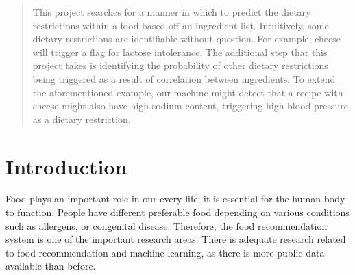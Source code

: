 \documentclass[twocolumn]{article}
\begin{document}
\begin{abstract}
This project searches for a manner in which to predict the dietary restrictions within a food based off an ingredient list. Intuitively, some dietary restrictions are identifiable without question. For example, cheese will trigger a flag for lactose intolerance. The additional step that this project takes is identifying the probability of other dietary restrictions being triggered as a result of correlation between ingredients. To extend the aforementioned example, our machine might detect that a recipe with cheese might also have high sodium content, triggering high blood pressure as a dietary restriction. 
\end{abstract}





%
\IEEEpeerreviewmaketitle




\section{Introduction}
Food plays an important role in our every life; it is essential for the human body to function. People have different preferable food depending on various conditions such as allergens, or congenital disease. Therefore, the food recommendation system is one of the important research areas. There is adequate research related to food recommendation and machine learning, as there is more public data available than before. 
\end{document}
